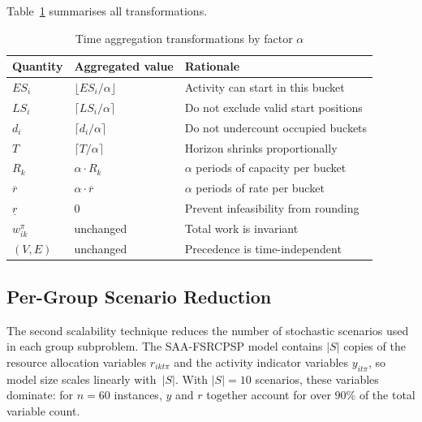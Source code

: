 Table~\ref{tab:time_agg_summary} summarises all transformations.

\begin{table}[ht]
\centering
\renewcommand{\arraystretch}{1.4}
\caption{Time aggregation transformations by factor $\alpha$}
\label{tab:time_agg_summary}
\begin{tabular}{lll}
\hline
\textbf{Quantity} &
\textbf{Aggregated value} &
\textbf{Rationale} \\
\hline
$ES_i$    & $\lfloor ES_i / \alpha \rfloor$
          & Activity can start in this bucket \\
$LS_i$    & $\lceil LS_i / \alpha \rceil$
          & Do not exclude valid start positions \\
$d_i$     & $\lceil d_i / \alpha \rceil$
          & Do not undercount occupied buckets \\
$T$       & $\lceil T / \alpha \rceil$
          & Horizon shrinks proportionally \\
$R_k$     & $\alpha \cdot R_k$
          & $\alpha$ periods of capacity per bucket \\
$\overline{r}$
          & $\alpha \cdot \overline{r}$
          & $\alpha$ periods of rate per bucket \\
$\underline{r}$
          & $0$
          & Prevent infeasibility from rounding \\
$w_{ik}^{\pi}$
          & unchanged
          & Total work is invariant \\
$(V, E)$  & unchanged
          & Precedence is time-independent \\
\hline
\end{tabular}
\end{table}

\subsection{Per-Group Scenario Reduction}
\label{subsec:scen_red}

The second scalability technique reduces the number of stochastic
scenarios used in each group subproblem. The SAA-FSRCPSP model
contains $|S|$ copies of the resource allocation variables
$r_{ikt\pi}$ and the activity indicator variables $y_{it\pi}$,
so model size scales linearly with~$|S|$. With $|S| = 10$
scenarios, these variables dominate: for $n = 60$ instances,
$y$ and $r$ together account for over $90\%$ of the total
variable count.

